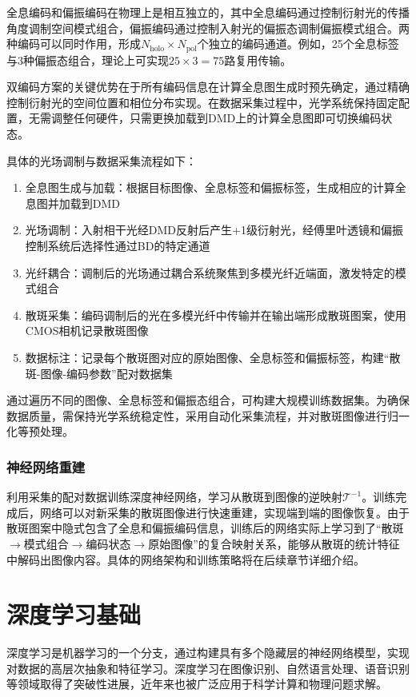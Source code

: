{全息编码和偏振编码在物理上是相互独立的，其中全息编码通过控制衍射光的传播角度调制空间模式组合，偏振编码通过控制入射光的偏振态调制偏振模式组合。两种编码可以同时作用，形成$N_{\text{holo}} \times N_{\text{pol}}$个独立的编码通道。例如，25个全息标签与3种偏振态组合，理论上可实现$25 \times 3 = 75$路复用传输。

双编码方案的关键优势在于所有编码信息在计算全息图生成时预先确定，通过精确控制衍射光的空间位置和相位分布实现。在数据采集过程中，光学系统保持固定配置，无需调整任何硬件，只需更换加载到DMD上的计算全息图即可切换编码状态。

具体的光场调制与数据采集流程如下：
\begin{enumerate}
    \item 全息图生成与加载：根据目标图像、全息标签和偏振标签，生成相应的计算全息图并加载到DMD
    \item 光场调制：入射相干光经DMD反射后产生+1级衍射光，经傅里叶透镜和偏振控制系统后选择性通过BD的特定通道
    \item 光纤耦合：调制后的光场通过耦合系统聚焦到多模光纤近端面，激发特定的模式组合
    \item 散斑采集：编码调制后的光在多模光纤中传输并在输出端形成散斑图案，使用CMOS相机记录散斑图像
    \item 数据标注：记录每个散斑图对应的原始图像、全息标签和偏振标签，构建“散斑-图像-编码参数”配对数据集
\end{enumerate}

通过遍历不同的图像、全息标签和偏振态组合，可构建大规模训练数据集。为确保数据质量，需保持光学系统稳定性，采用自动化采集流程，并对散斑图像进行归一化等预处理。

\subsubsection{神经网络重建}

利用采集的配对数据训练深度神经网络，学习从散斑到图像的逆映射$\mathcal{T}^{-1}$。训练完成后，网络可以对新采集的散斑图像进行快速重建，实现端到端的图像恢复。由于散斑图案中隐式包含了全息和偏振编码信息，训练后的网络实际上学习到了“散斑$\rightarrow$模式组合$\rightarrow$编码状态$\rightarrow$原始图像”的复合映射关系，能够从散斑的统计特征中解码出图像内容。具体的网络架构和训练策略将在后续章节详细介绍。


\section{深度学习基础}\label{sec:dl_basics}

深度学习是机器学习的一个分支，通过构建具有多个隐藏层的神经网络模型，实现对数据的高层次抽象和特征学习\citep{lecun2015deep}。深度学习在图像识别、自然语言处理、语音识别等领域取得了突破性进展，近年来也被广泛应用于科学计算和物理问题求解。

}

